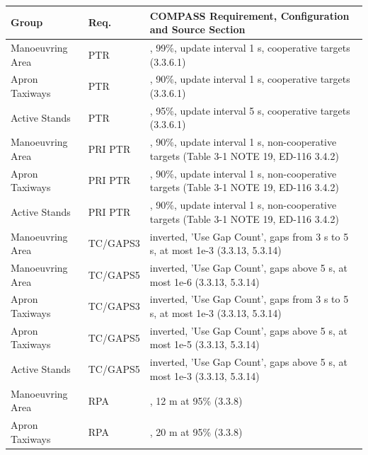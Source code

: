 \begin{center}
 \begin{table}[H]
  \begin{tabularx}{\textwidth}{ | l | l | X | }
    \hline
    \textbf{Group} & \textbf{Req.} & \textbf{COMPASS Requirement, Configuration and Source Section} \\ \hline
    Manoeuvring Area & PTR & \nameref{sec:eval_req_detection}, 99\%, update interval 1 s, cooperative targets (3.3.6.1) \\ \hline
    Apron Taxiways & PTR & \nameref{sec:eval_req_detection}, 90\%, update interval 1 s, cooperative targets (3.3.6.1) \\ \hline
    Active Stands & PTR & \nameref{sec:eval_req_detection}, 95\%, update interval 5 s, cooperative targets (3.3.6.1) \\ \hline
    Manoeuvring Area & PRI PTR & \nameref{sec:eval_req_detection}, 90\%, update interval 1 s, non-cooperative targets (Table 3-1 NOTE 19, ED-116 3.4.2) \\ \hline
    Apron Taxiways & PRI PTR & \nameref{sec:eval_req_detection}, 90\%, update interval 1 s, non-cooperative targets (Table 3-1 NOTE 19, ED-116 3.4.2) \\ \hline
    Active Stands & PRI PTR & \nameref{sec:eval_req_detection}, 90\%, update interval 1 s, non-cooperative targets (Table 3-1 NOTE 19, ED-116 3.4.2) \\ \hline
    Manoeuvring Area & TC/GAPS3 & \nameref{sec:eval_req_detection} inverted, 'Use Gap Count', gaps from 3 s to 5 s, at most 1e-3 (3.3.13, 5.3.14) \\ \hline
    Manoeuvring Area & TC/GAPS5 & \nameref{sec:eval_req_detection} inverted, 'Use Gap Count', gaps above 5 s, at most 1e-6 (3.3.13, 5.3.14) \\ \hline
    Apron Taxiways & TC/GAPS3 & \nameref{sec:eval_req_detection} inverted, 'Use Gap Count', gaps from 3 s to 5 s, at most 1e-3 (3.3.13, 5.3.14) \\ \hline
    Apron Taxiways & TC/GAPS5 & \nameref{sec:eval_req_detection} inverted, 'Use Gap Count', gaps above 5 s, at most 1e-5 (3.3.13, 5.3.14) \\ \hline
    Active Stands & TC/GAPS5 & \nameref{sec:eval_req_detection} inverted, 'Use Gap Count', gaps above 5 s, at most 1e-3 (3.3.13, 5.3.14) \\ \hline
    Manoeuvring Area & RPA & \nameref{sec:eval_req_pos_distance}, 12 m at 95\% (3.3.8) \\ \hline
    Apron Taxiways & RPA & \nameref{sec:eval_req_pos_distance}, 20 m at 95\% (3.3.8) \\ \hline

\end{tabularx}
\end{table}
\end{center}
